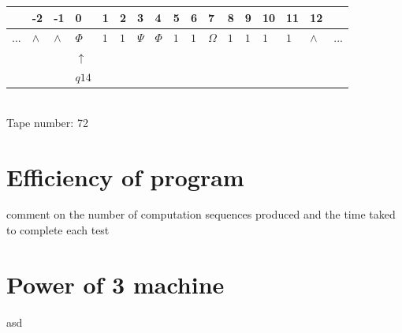 \documentclass[11pt]{article}
\begin{document}
\begin{table}[H]
\centering
\begin{tabular}{lllllllllllllllll}
 & -2 & -1 & 0 & 1 & 2 & 3 & 4 & 5 & 6 & 7 & 8 & 9 & 10 & 11 & 12 & \\
\hline
$...$ & \multicolumn{1}{|l|}{$\wedge$} & \multicolumn{1}{|l|}{$\wedge$} & \multicolumn{1}{|l|}{$\Phi$} & \multicolumn{1}{|l|}{$1$} & \multicolumn{1}{|l|}{$1$} & \multicolumn{1}{|l|}{$\Psi$} & \multicolumn{1}{|l|}{$\Phi$} & \multicolumn{1}{|l|}{$1$} & \multicolumn{1}{|l|}{$1$} & \multicolumn{1}{|l|}{$\Omega$} & \multicolumn{1}{|l|}{$1$} & \multicolumn{1}{|l|}{$1$} & \multicolumn{1}{|l|}{$1$} & \multicolumn{1}{|l|}{$1$} & \multicolumn{1}{|l|}{$\wedge$} & $...$\\
\hline
&  &  & $\uparrow$ &  &  &  &  &  &  &  &  &  &  &  &  &  \\
&  &  & $ q14 $ &  &  &  &  &  &  &  &  &  &  &  &  &  \\
\end{tabular}
\\
Tape number: 72
\noindent\makebox[\linewidth]{\hdashrule{\textwidth}{1pt}{1pt}}\end{table}
\clearpage

\section{Efficiency of program}
comment on the number of computation sequences produced and the time taked to complete each test
\section{Power of 3 machine}
asd
\end{document}
